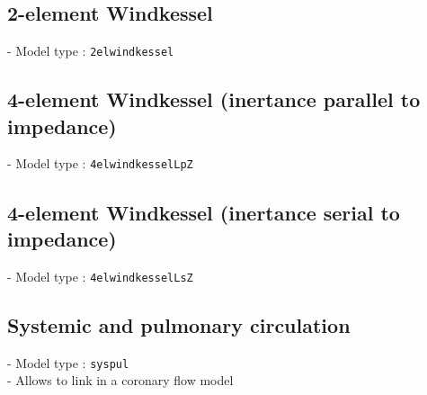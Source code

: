 \documentclass[a4paper,12pt]{report}
\begin{document}
\subsection{2-element Windkessel}

- Model type : \verb.2elwindkessel.\\

\subsection{4-element Windkessel (inertance parallel to impedance)}

- Model type : \verb.4elwindkesselLpZ.\\

\subsection{4-element Windkessel (inertance serial to impedance)}

- Model type : \verb.4elwindkesselLsZ.\\

\subsection{Systemic and pulmonary circulation}

- Model type : \verb.syspul.\\

- Allows to link in a coronary flow model
\end{document}
